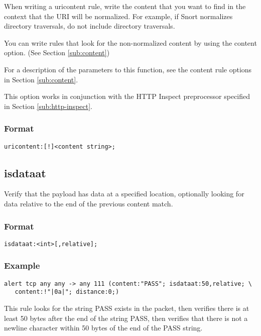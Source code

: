 \documentclass[english]{report}
\begin{document}
When writing a uricontent rule, write the content that you want to find in the
context that the URI will be normalized.  For example, if Snort normalizes directory traversals, do not include directory traversals.  

You can write rules that look for the non-normalized content by using the content option.  (See Section \ref{sub:content})

For a description of the parameters to this function, see the content rule
options in Section \ref{sub:content}. 

This option works in conjunction with the HTTP Inspect preprocessor specified
in Section \ref{sub:http-inspect}.

\subsubsection{Format}

\begin{verbatim}
uricontent:[!]<content string>;
\end{verbatim}

\subsection{isdataat}

Verify that the payload has data at a specified location, optionally looking for data relative to the end of the previous content match.

\subsubsection{Format}

\begin{verbatim}
isdataat:<int>[,relative];
\end{verbatim}

\subsubsection{Example}
\begin{verbatim}
alert tcp any any -> any 111 (content:"PASS"; isdataat:50,relative; \ 
   content:!"|0a|"; distance:0;)
\end{verbatim}
This rule looks for the string PASS exists in the packet, then verifies there
is at least 50 bytes after the end of the string PASS, then verifies that there
is not a newline character within 50 bytes of the end of the PASS string.
\end{document}
